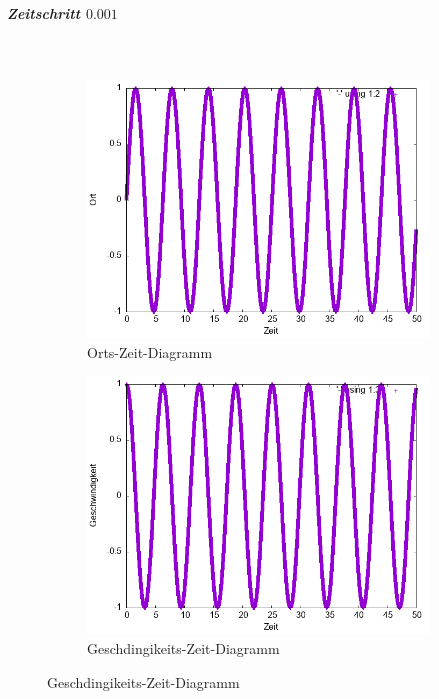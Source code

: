 \documentclass[
    oneside,
    ngerman,
    footinclude=false,
    captions=tableheading,
    DIV=12
]{scrartcl}
\begin{document}
                \subparagraph*{Zeitschritt $0.001$}\,
                \begin{figure}[H]
                    \centering
                    \begin{subfigure}[b]{0.45\textwidth}
                        \centering
                        \includegraphics[width=\textwidth]{Bilddateien/expEulerA1(a)-0001-0-x.png}
                        \caption{Orts-Zeit-Diagramm}
                        \label{fig:expEulerA1(a)-0001-0-x}
                    \end{subfigure}
                    \hfill
                    \begin{subfigure}[b]{0.45\textwidth}
                        \centering
                        \includegraphics[width=\textwidth]{Bilddateien/expEulerA1(a)-0001-0-v.png}
                        \caption{Geschdingikeits-Zeit-Diagramm}
                        \label{fig:expEulerA1(a)-0001-0-v}
                    \end{subfigure}
                \end{figure}
                
\end{document}
